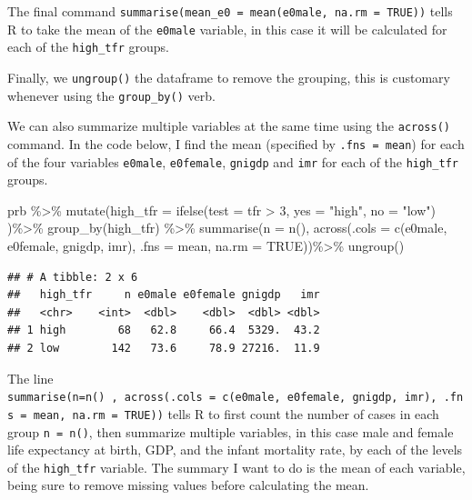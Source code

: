 \documentclass[
]{book}
\newenvironment{Shaded}{\begin{snugshade}}{\end{snugshade}}
\newcommand{\AttributeTok}[1]{\textcolor[rgb]{0.77,0.63,0.00}{#1}}
\newcommand{\ConstantTok}[1]{\textcolor[rgb]{0.00,0.00,0.00}{#1}}
\newcommand{\DecValTok}[1]{\textcolor[rgb]{0.00,0.00,0.81}{#1}}
\newcommand{\FunctionTok}[1]{\textcolor[rgb]{0.00,0.00,0.00}{#1}}
\newcommand{\NormalTok}[1]{#1}
\newcommand{\SpecialCharTok}[1]{\textcolor[rgb]{0.00,0.00,0.00}{#1}}
\newcommand{\StringTok}[1]{\textcolor[rgb]{0.31,0.60,0.02}{#1}}
\begin{document}
The final command \texttt{summarise(mean\_e0\ =\ mean(e0male,\ na.rm\ =\ TRUE))} tells R to take the mean of the \texttt{e0male} variable, in this case it will be calculated for each of the \texttt{high\_tfr} groups.

Finally, we \texttt{ungroup()} the dataframe to remove the grouping, this is
customary whenever using the \texttt{group\_by()} verb.

We can also summarize multiple variables at the same time using the \texttt{across()} command. In the code below, I find the mean (specified by \texttt{.fns\ =\ mean}) for each of the four variables \texttt{e0male}, \texttt{e0female}, \texttt{gnigdp} and \texttt{imr} for each of the \texttt{high\_tfr} groups.

\begin{Shaded}
\begin{Highlighting}[]
\NormalTok{prb }\SpecialCharTok{\%\textgreater{}\%}
  \FunctionTok{mutate}\NormalTok{(}\AttributeTok{high\_tfr =} \FunctionTok{ifelse}\NormalTok{(}\AttributeTok{test =}\NormalTok{ tfr }\SpecialCharTok{\textgreater{}} \DecValTok{3}\NormalTok{,}
                           \AttributeTok{yes =}  \StringTok{"high"}\NormalTok{,}
                           \AttributeTok{no =}  \StringTok{"low"}\NormalTok{) )}\SpecialCharTok{\%\textgreater{}\%}
  \FunctionTok{group\_by}\NormalTok{(high\_tfr) }\SpecialCharTok{\%\textgreater{}\%}
  \FunctionTok{summarise}\NormalTok{(}\AttributeTok{n =} \FunctionTok{n}\NormalTok{(),}
            \FunctionTok{across}\NormalTok{(}\AttributeTok{.cols =} \FunctionTok{c}\NormalTok{(e0male, e0female, gnigdp, imr),}
                   \AttributeTok{.fns =}\NormalTok{ mean,}
                   \AttributeTok{na.rm =} \ConstantTok{TRUE}\NormalTok{))}\SpecialCharTok{\%\textgreater{}\%}
  \FunctionTok{ungroup}\NormalTok{()}
\end{Highlighting}
\end{Shaded}

\begin{verbatim}
## # A tibble: 2 x 6
##   high_tfr     n e0male e0female gnigdp   imr
##   <chr>    <int>  <dbl>    <dbl>  <dbl> <dbl>
## 1 high        68   62.8     66.4  5329.  43.2
## 2 low        142   73.6     78.9 27216.  11.9
\end{verbatim}

The line \texttt{summarise(n=n()\ ,\ across(.cols\ =\ c(e0male,\ e0female,\ gnigdp,\ imr),\ .fns\ =\ mean,\ na.rm\ =\ TRUE))}
tells R to first count the number of cases in each group \texttt{n\ =\ n()}, then
summarize multiple variables, in this case male and female life
expectancy at birth, GDP, and the infant mortality rate, by each of the
levels of the \texttt{high\_tfr} variable. The summary I want to do is the mean
of each variable, being sure to remove missing values before calculating
the mean.
\end{document}

